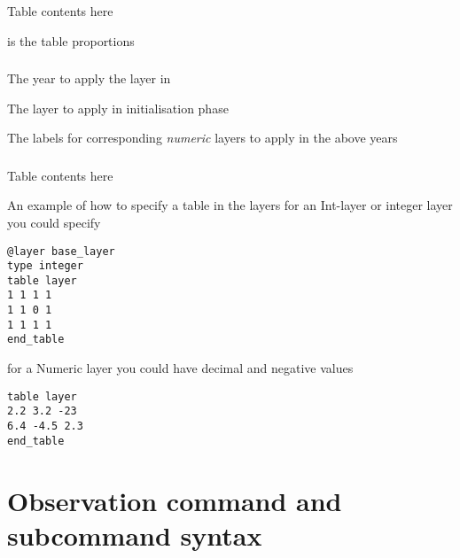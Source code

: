 \subsubsection[Numeric]{}
 {}
Table contents here\\
 {}

 {is the table proportions}

\subsubsection[Numeric]{}
 {The year to apply the layer in}

 {The layer to apply in initialisation phase}

 {The labels for corresponding \emph{numeric} layers to apply in the above years}

\subsubsection[Numeric]{}
 {}
Table contents here\\
 {}




An example of how to specify a table in the layers for an Int-layer or integer layer you could specify

{\small{\begin{verbatim}
@layer base_layer
type integer		
table layer
1 1 1 1
1 1 0 1
1 1 1 1
end_table
\end{verbatim}}}

for a Numeric layer you could have decimal and negative values
{\small{\begin{verbatim}
table layer
2.2 3.2 -23
6.4 -4.5 2.3
end_table
\end{verbatim}}}

\section{Observation command and subcommand syntax\label{sec:observation-syntax}}

